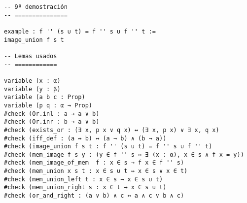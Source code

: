 \begin{verbatim}
-- 9ª demostración
-- ===============

example : f '' (s ∪ t) = f '' s ∪ f '' t :=
image_union f s t

-- Lemas usados
-- ============

variable (x : α)
variable (y : β)
variable (a b c : Prop)
variable (p q : α → Prop)
#check (Or.inl : a → a ∨ b)
#check (Or.inr : b → a ∨ b)
#check (exists_or : (∃ x, p x ∨ q x) ↔ (∃ x, p x) ∨ ∃ x, q x)
#check (iff_def : (a ↔ b) ↔ (a → b) ∧ (b → a))
#check (image_union f s t : f '' (s ∪ t) = f '' s ∪ f '' t)
#check (mem_image f s y : (y ∈ f '' s ↔ ∃ (x : α), x ∈ s ∧ f x = y))
#check (mem_image_of_mem  f : x ∈ s → f x ∈ f '' s)
#check (mem_union x s t : x ∈ s ∪ t ↔ x ∈ s ∨ x ∈ t)
#check (mem_union_left t : x ∈ s → x ∈ s ∪ t)
#check (mem_union_right s : x ∈ t → x ∈ s ∪ t)
#check (or_and_right : (a ∨ b) ∧ c ↔ a ∧ c ∨ b ∧ c)
\end{verbatim}

